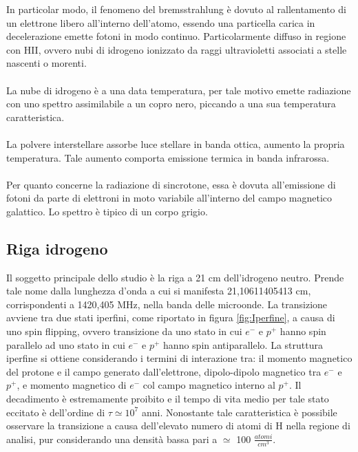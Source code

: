 In particolar modo, il fenomeno del bremsstrahlung è dovuto al rallentamento di un elettrone libero all'interno dell'atomo, essendo una particella carica in decelerazione emette fotoni in modo continuo. Particolarmente diffuso in regione con HII, ovvero nubi di idrogeno ionizzato da raggi ultravioletti associati a stelle nascenti o morenti.
\\\\
La nube di idrogeno è a una data temperatura, per tale motivo emette radiazione con uno spettro assimilabile a un copro nero, piccando a una sua temperatura caratteristica. 
\\\\
La polvere interstellare assorbe luce stellare in banda ottica, aumento la propria temperatura. Tale aumento comporta emissione termica in banda infrarossa.
\\\\
Per quanto concerne la radiazione di sincrotone, essa è dovuta all'emissione di fotoni da parte di elettroni in moto variabile all'interno del campo magnetico galattico. Lo spettro è tipico di un corpo grigio\cite{Gervasi22:Dispensa}.


\subsection{Riga idrogeno}
Il soggetto principale dello studio è la riga a 21 cm dell'idrogeno neutro. Prende tale nome dalla lunghezza d'onda a cui si manifesta 21,10611405413 cm, corrispondenti a 1420,405 MHz, nella banda delle microonde. La transizione avviene tra due stati iperfini, come riportato in figura \ref{fig:Iperfine}, a causa di uno spin flipping, ovvero transizione da uno stato in cui $e^{-}$ e $p^{+}$ hanno spin parallelo ad uno stato in cui $e^{-}$ e $p^{+}$ hanno spin antiparallelo. La struttura iperfine si ottiene considerando i termini di interazione tra: il momento magnetico del protone e il campo generato dall'elettrone, dipolo-dipolo magnetico tra $e^{-}$ e $p^{+}$, e momento magnetico di $e^{-}$ col campo magnetico interno al $p^{+}$\cite{Cohen:libro}.
Il decadimento è estremamente proibito e il tempo di vita medio per tale stato eccitato è dell'ordine di $\tau \simeq 10 ^{7}$  anni\cite{Mhaske:articolo}.
Nonostante tale caratteristica è possibile osservare la transizione  a causa dell'elevato numero di atomi di H nella regione di analisi, pur considerando una densità bassa pari a $\simeq$ 100 $\frac{atomi}{cm^{3}}$. 


